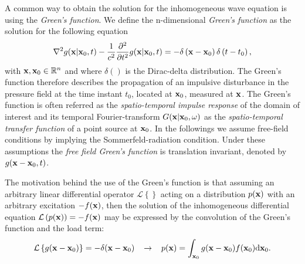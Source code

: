 A common way to obtain the solution for the inhomogeneous wave equation is using the \emph{Green's function}. We define the n-dimensional \emph{Green's function} as the solution for the following equation \cite{Gumerov2004, Williams1999}
\begin{equation}
\nabla^2 g(\mathbf{x}|\mathbf{x}_0,t) -\frac{1}{c^2}\frac{\partial^2}{\partial t^2} g(\mathbf{x}|\mathbf{x}_0,t) = -\delta\left( \mathbf{x} - \mathbf{x}_0 \right)\delta\left( t - t_0 \right),
\label{Eq:Theory:Green_function_def}
\end{equation}
with $\mathbf{x}, \mathbf{x}_0 \in \mathbb{R}^{n}$ and where $\delta()$ is the Dirac-delta distribution. The Green's function therefore describes the propagation of an impulsive disturbance in the pressure field at the time instant $t_0$, located at $\mathbf{x}_0$, measured at $\mathbf{x}$. The Green's function is often referred as the \emph{spatio-temporal impulse response} of the domain of interest and its temporal Fourier-transform $G(\mathbf{x}|\mathbf{x}_0,\omega)$ as the \emph{spatio-temporal transfer function} of a point source at $\mathbf{x}_0$. In the followings we assume free-field conditions by implying the Sommerfeld-radiation condition. Under these assumptions the \emph{free field Green's function} is translation invariant, denoted by $g(\mathbf{x}-\mathbf{x}_0,t)$.

The motivation behind the use of the Green's function is that assuming an arbitrary linear differential operator $\mathcal{L}\left\{ \right\}$ acting on a distribution $p(\mathbf{x})$ with an arbitrary excitation $-f(\mathbf{x})$, then the solution of the inhomogeneous differential equation $\mathcal{L}\left(p(\mathbf{x})\right) = -f(\mathbf{x})$ may be expressed by the convolution of the Green's function and the load term:
\begin{equation}
\mathcal{L}\left\{ g(\mathbf{x}-\mathbf{x}_0) \right\} = -\delta( \mathbf{x}-\mathbf{x}_0 ) \hspace{3mm} \rightarrow \hspace{3mm}
p(\mathbf{x}) = \int_{\mathbf{x}_0 }  g(\mathbf{x}-\mathbf{x}_0) f(\mathbf{x}_0) \mathrm{d} \mathbf{x}_0.
\label{Eq:Theory:Basic_Green_function_eq}
\end{equation}

